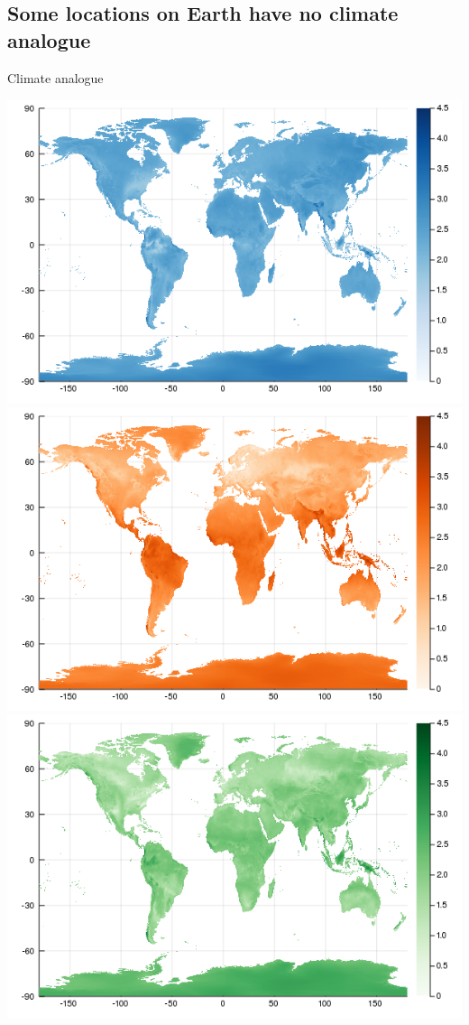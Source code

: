 \hypertarget{some-locations-on-earth-have-no-climate-analogue}{%
\subsection{Some locations on Earth have no climate
analogue}\label{some-locations-on-earth-have-no-climate-analogue}}

Climate analogue

\includegraphics{figures/envirodistance_mutualism.png}
\includegraphics{figures/envirodistance_parasitism.png}
\includegraphics{figures/envirodistance_predation.png}

